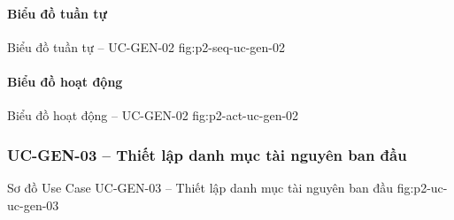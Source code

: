 \clearpage
\paragraph{Biểu đồ tuần tự}
  {Biểu đồ tuần tự -- UC-GEN-02}
  {fig:p2-seq-uc-gen-02}

\clearpage
\paragraph{Biểu đồ hoạt động}
  {Biểu đồ hoạt động -- UC-GEN-02}
  {fig:p2-act-uc-gen-02}

\clearpage
\subsubsection{UC-GEN-03 -- Thiết lập danh mục tài nguyên ban đầu}

  {Sơ đồ Use Case UC-GEN-03 -- Thiết lập danh mục tài nguyên ban đầu}
  {fig:p2-uc-uc-gen-03}

